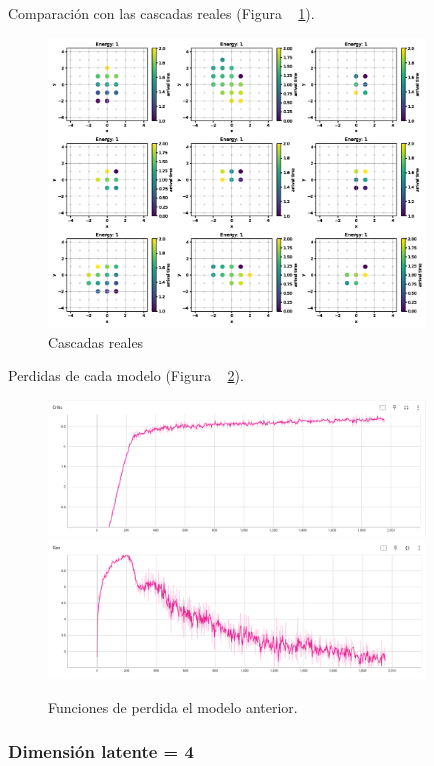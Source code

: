 Comparación con las cascadas reales (Figura ~ \ref{fig:ld128r0realshower}).

\begin{figure}
    \centering
    \includegraphics[width=100mm,scale=0.5]{Figures/res/CWGANGP_LD128_R0/real.png}
    \decoRule
    \caption[Cascadas reales 0]{
        Cascadas reales
    }
    \label{fig:ld128r0realshower}
\end{figure}

Perdidas de cada modelo (Figura ~ \ref{fig:ld128r0losses}).

\begin{figure}
    \centering
    \includegraphics[width=100mm,scale=0.5]{Figures/res/CWGANGP_LD128_R0/critic.png}
    \includegraphics[width=100mm,scale=0.5]{Figures/res/CWGANGP_LD128_R0/gen.png}
    \decoRule
    \caption[Perdidas 0]{
        Funciones de perdida el modelo anterior.
    }
    \label{fig:ld128r0losses}
\end{figure}

\subsubsection*{Dimensión latente = 4}

